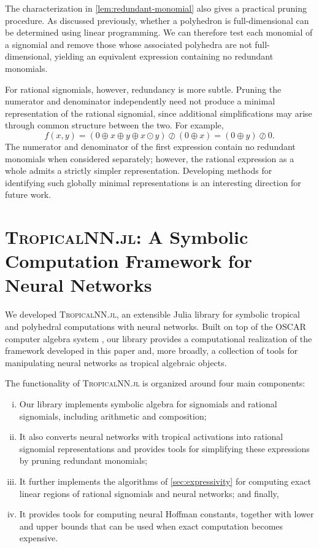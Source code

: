 \documentclass[10pt]{article}
\theoremstyle{definition}
\theoremstyle{remark}
\begin{document}
The characterization in \cref{lem:redundant-monomial} also gives a practical pruning procedure. As discussed previously, whether a polyhedron is full-dimensional can be determined using linear programming. We can therefore test each monomial of a signomial and remove those whose associated polyhedra are not full-dimensional, yielding an equivalent expression containing no redundant monomials.

For rational signomials, however, redundancy is more subtle. Pruning the numerator and denominator independently need not produce a minimal representation of the rational signomial, since additional simplifications may arise through common structure between the two. For example,
$$
f(x,y) = (0\oplus x\oplus y\oplus x\odot y) \oslash(0\oplus x) = (0\oplus y)\oslash 0.
$$
The numerator and denominator of the first expression contain no redundant monomials when considered separately; however, the rational expression as a whole admits a strictly simpler representation. Developing methods for identifying such globally minimal representations is an interesting direction for future work.


% 

\section{\textsc{TropicalNN.jl}: A Symbolic Computation Framework for Neural Networks} \label{sec:library}

We developed \textsc{TropicalNN.jl}, an extensible Julia library for
symbolic tropical and polyhedral computations with neural networks.  Built on top of the OSCAR computer algebra system \citep{OSCAR}, our
library provides a computational realization of the framework developed in this paper and, more broadly, a collection of tools for manipulating neural networks as tropical algebraic objects.

The functionality of \textsc{TropicalNN.jl} is organized around four
main components: 
\begin{enumerate}[(i)]
\item Our library implements symbolic algebra for
signomials and rational signomials, including arithmetic and composition;
\item It also converts neural networks with tropical activations into rational signomial representations and provides tools for simplifying these expressions by pruning redundant monomials;
\item It further implements the algorithms of \cref{sec:expressivity} for computing exact linear regions of rational signomials and neural networks; and finally,
\item It provides tools for computing neural Hoffman constants, together with lower and upper bounds that can be used when exact computation becomes expensive. 
\end{enumerate}
\end{document}
